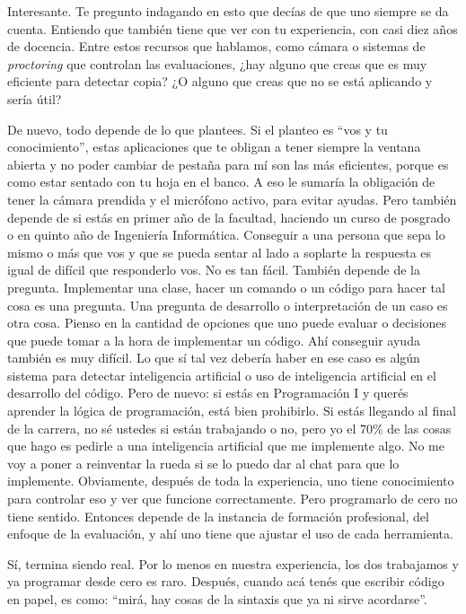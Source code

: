 \begin{description}[leftmargin=0cm, labelsep=0.5cm, style=nextline]
\item[\textbf{Entrevistadores:}] Interesante. Te pregunto indagando en esto que decías de que uno siempre se da cuenta. Entiendo que también tiene que ver con tu experiencia, con casi diez años de docencia. Entre estos recursos que hablamos, como cámara o sistemas de \textit{proctoring} que controlan las evaluaciones, ¿hay alguno que creas que es muy eficiente para detectar copia? ¿O alguno que creas que no se está aplicando y sería útil?
\item[\textbf{Entrevistado:}] De nuevo, todo depende de lo que plantees. Si el planteo es ``vos y tu conocimiento'', estas aplicaciones que te obligan a tener siempre la ventana abierta y no poder cambiar de pestaña para mí son las más eficientes, porque es como estar sentado con tu hoja en el banco. A eso le sumaría la obligación de tener la cámara prendida y el micrófono activo, para evitar ayudas. Pero también depende de si estás en primer año de la facultad, haciendo un curso de posgrado o en quinto año de Ingeniería Informática. Conseguir a una persona que sepa lo mismo o más que vos y que se pueda sentar al lado a soplarte la respuesta es igual de difícil que responderlo vos. No es tan fácil. También depende de la pregunta. Implementar una clase, hacer un comando o un código para hacer tal cosa es una pregunta. Una pregunta de desarrollo o interpretación de un caso es otra cosa. Pienso en la cantidad de opciones que uno puede evaluar o decisiones que puede tomar a la hora de implementar un código. Ahí conseguir ayuda también es muy difícil. Lo que sí tal vez debería haber en ese caso es algún sistema para detectar inteligencia artificial o uso de inteligencia artificial en el desarrollo del código. Pero de nuevo: si estás en Programación I y querés aprender la lógica de programación, está bien prohibirlo. Si estás llegando al final de la carrera, no sé ustedes si están trabajando o no, pero yo el 70\% de las cosas que hago es pedirle a una inteligencia artificial que me implemente algo. No me voy a poner a reinventar la rueda si se lo puedo dar al chat para que lo implemente. Obviamente, después de toda la experiencia, uno tiene conocimiento para controlar eso y ver que funcione correctamente. Pero programarlo de cero no tiene sentido. Entonces depende de la instancia de formación profesional, del enfoque de la evaluación, y ahí uno tiene que ajustar el uso de cada herramienta.
\item[\textbf{Entrevistadores:}] Sí, termina siendo real. Por lo menos en nuestra experiencia, los dos trabajamos y ya programar desde cero es raro. Después, cuando acá tenés que escribir código en papel, es como: ``mirá, hay cosas de la sintaxis que ya ni sirve acordarse''.

\end{description}
